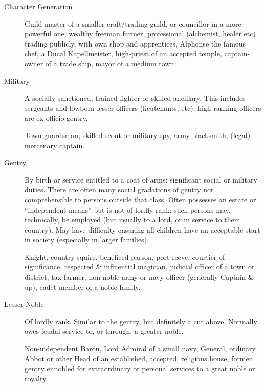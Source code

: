 \begin{Chapter}{Character Generation}
\begin{description}
  \begin{example} 
    Guild master of a smaller craft/trading guild, or councillor in a
    more powerful one, wealthy freeman farmer, professional
    (alchemist, healer etc) trading publicly, with own shop and
    apprentices, Alphonse the famous chef, a Ducal Kapellmeister,
    high-priest of an accepted temple, captain-owner of a trade ship,
    mayor of a medium town.
  \end{example}
  
\item[Military] A socially sanctioned, trained fighter or skilled
  ancillary.  This includes sergeants and lowborn lesser officers
  (lieutenants, etc); high-ranking officers are ex officio gentry.
  
  \begin{example} 
    Town guardsman, skilled scout or military spy, army blacksmith,
    (legal) mercenary captain.
  \end{example}

\item[Gentry] By birth or service entitled to a coat of arms:
  significant social or military duties.  There are often many social
  gradations of gentry not comprehensible to persons outside that
  class.  Often possesses an estate or “independent means” but is not
  of lordly rank; such persons may, technically, be employed (but
  usually to a lord, or in service to their country).  May have
  difficulty ensuring all children have an acceptable start in society
  (especially in larger families).

  \begin{example}
    Knight, country squire, beneficed parson, port-reeve, courtier of
    significance, respected \& influential magician, judicial officer
    of a town or district, tax farmer, non-noble army or navy officer
    (generally Captain \& up), cadet member of a noble family.
  \end{example}

\item[Lesser Noble] Of lordly rank. Similar to the gentry, but
  definitely a cut above.  Normally owes feudal service to, or
  through, a greater noble.

  \begin{example}
    Non-independent Baron, Lord Admiral of a small navy, General,
    ordinary Abbot or other Head of an established, accepted,
    religious house, former gentry ennobled for extraordinary or
    personal services to a great noble or royalty.
  \end{example}
  

\end{description}
\end{Chapter}
